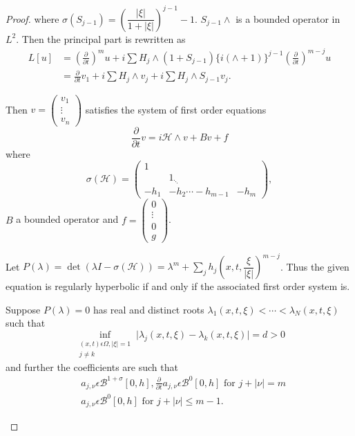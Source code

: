 \begin{proof}
\smallskip
\noindent
where $\sigma(S_{j-1}) = \left(\dfrac{| \xi|}{1+ | \xi
  |}\right)^{j-1}-1$. $S_{j-1} \wedge$ is a bounded operator in $L^2$. Then  
the principal part is rewritten as 
\begin{align*}
L[u] & =  \left(\frac{\partial}{\partial t}\right)^m u + i \sum H_j \wedge (1 +
S_{j-1}) \{ i(\wedge + 1)\}^{j-1} \left(\frac{\partial}{\partial t }\right)^{m-j}
u\\ 
& = \frac{\partial}{ \partial t} v_1 + i \sum H_j \wedge v_j + i \sum
H_j \wedge S_{j-1} v_j. 
\end{align*}

Then $ v = \begin{pmatrix} v_1 \\  \vdots \\ v_n \end{pmatrix}$
satisfies the system of first order equations 
\begin{equation}
\frac{\partial}{\partial t}  v = i \mathscr{H} \wedge v + B v + f
\tag{6.16} \label{chap3-eq6.16}
\end{equation}
where\pageoriginale
\begin{equation}
\sigma (\mathscr{H}) = 
\begin{pmatrix} 
1 & & \\
&  1_{\ddots} &  \\
-h_1 &  -h_2\cdots -h_{m-1} & -h_m   
\end{pmatrix},\tag{6.17} \label{chap3-eq6.17}
\end{equation}
$B$ a bounded operator and $f = \begin{pmatrix}
 0 \\
 \vdots \\
0\\
 g \end{pmatrix}$. 

Let $P(\lambda) = \det (\lambda I-\sigma (\mathscr{H})) =
\lambda^m+\sum_{j} h_j \left(x, t, \dfrac{\xi}{|\xi|}\right)^{m-j}$. Thus the given
equation is regularly hyperbolic if and only if the associated first
order system is. 

\begin{proposition}\label{chap3-sec6-prop4}%
Suppose $P(\lambda) = 0$ has real and distinct roots $\lambda_1(x, t,
\xi) < \cdots < \lambda_N (x, t, \xi)$ such that 
\begin{equation}
\inf_{\substack{(x, t) \epsilon  \Omega , |\xi |=1  \\  j \neq k}} \big|
\lambda_j (x, t, \xi ) - \lambda_k (x, t, \xi ) \big| = d > 0
\tag{6.18}\label{chap3-eq6.18}  
\end{equation}
and further the coefficients are such that
\begin{align*}
& a_{j,\nu }\epsilon \mathscr{B}^{1+\sigma}[0, h],
\frac{\partial}{\partial t}a_{j,\nu} \epsilon \mathscr{B}^0 [0,h]
\text{ for } j+|\nu | = m \\ 
& a_{j, \nu} \epsilon \mathscr{B}^0 [0, h] \text{ for } j+| \nu | \leq
m-1. 
\end{align*}
\end{proposition}


\end{proof}
